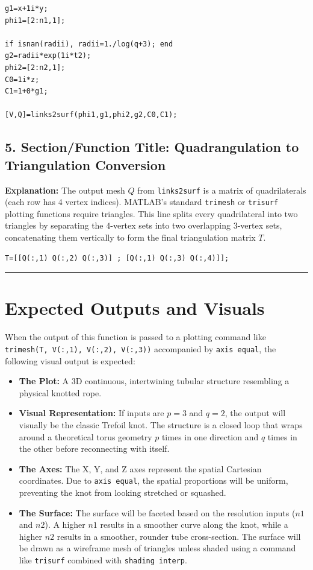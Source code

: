 \begin{lstlisting}
g1=x+1i*y;
phi1=[2:n1,1];

if isnan(radii), radii=1./log(q+3); end 
g2=radii*exp(1i*t2); 
phi2=[2:n2,1]; 
C0=1i*z; 
C1=1+0*g1; 

[V,Q]=links2surf(phi1,g1,phi2,g2,C0,C1); 
\end{lstlisting}

\subsection*{5. Section/Function Title: Quadrangulation to Triangulation Conversion}
\textbf{Explanation:} The output mesh $Q$ from \texttt{links2surf} is a matrix of quadrilaterals (each row has 4 vertex indices). MATLAB's standard \texttt{trimesh} or \texttt{trisurf} plotting functions require triangles. This line splits every quadrilateral into two triangles by separating the $4$-vertex sets into two overlapping $3$-vertex sets, concatenating them vertically to form the final triangulation matrix $T$.

\begin{lstlisting}
T=[[Q(:,1) Q(:,2) Q(:,3)] ; [Q(:,1) Q(:,3) Q(:,4)]];
\end{lstlisting}

\vspace{0.5cm}
\hrule
\vspace{0.5cm}

\section*{Expected Outputs and Visuals}

When the output of this function is passed to a plotting command like \texttt{trimesh(T, V(:,1), V(:,2), V(:,3))} accompanied by \texttt{axis equal}, the following visual output is expected:

\begin{itemize}
    \item \textbf{The Plot:} A 3D continuous, intertwining tubular structure resembling a physical knotted rope. 
    \item \textbf{Visual Representation:} If inputs are $p=3$ and $q=2$, the output will visually be the classic Trefoil knot. The structure is a closed loop that wraps around a theoretical torus geometry $p$ times in one direction and $q$ times in the other before reconnecting with itself.
    \item \textbf{The Axes:} The X, Y, and Z axes represent the spatial Cartesian coordinates. Due to \texttt{axis equal}, the spatial proportions will be uniform, preventing the knot from looking stretched or squashed. 
    \item \textbf{The Surface:} The surface will be faceted based on the resolution inputs ($n1$ and $n2$). A higher $n1$ results in a smoother curve along the knot, while a higher $n2$ results in a smoother, rounder tube cross-section. The surface will be drawn as a wireframe mesh of triangles unless shaded using a command like \texttt{trisurf} combined with \texttt{shading interp}.
\end{itemize}
